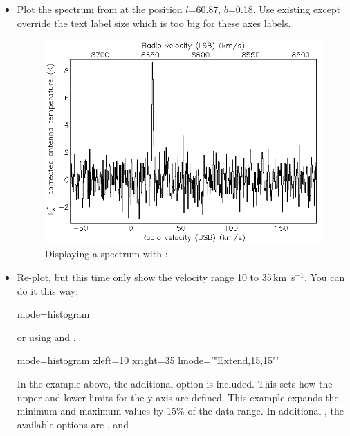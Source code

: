 \documentclass[11pt,oneside,chapters]{starlink}
\newcommand{\udeg}{\hspace{-0.3em}\dgs\hspace{-0.08em}}
\newcommand{\kms}{\mbox{$\,$km~s$^{-1}$}}   %
\newcommand{\udeg}{\HCode{&deg}}
\newcommand{\kms}{\,km~s$^{-1}$}   %
\begin{document}
\begin{itemize}
\item Plot the spectrum from  at the position
$l$=60.\udeg87, $b$=0.\udeg18. Use existing  except
override the text label size which is too big for these axes labels.
\begin{terminalv}
\end{terminalv}

\begin{figure}[h!]
\begin{center}
\includegraphics[width=0.55\linewidth]{sc20_display3}
\caption[Displaying a spectrum with \Kappa:\linplot.]{\label{fig:display3}
  Displaying a spectrum with \Kappa:\linplot.}
\end{center}
\end{figure}

\item Re-plot, but this time only show the velocity range 10 to 35\kms.
You can do it this way:
\begin{terminalv}
  mode=histogram
\end{terminalv}
or using  and .
\begin{terminalv}
  mode=histogram xleft=10 xright=35 lmode='"Extend,15,15"'
\end{terminalv}
In the example above, the additional option  is included.
This sets how the upper and lower limits for the y-axis are defined.
This example expands the minimum and maximum values by 15\% of the
data range. In additional , the available options are
,  and .


\end{itemize}
\end{document}
